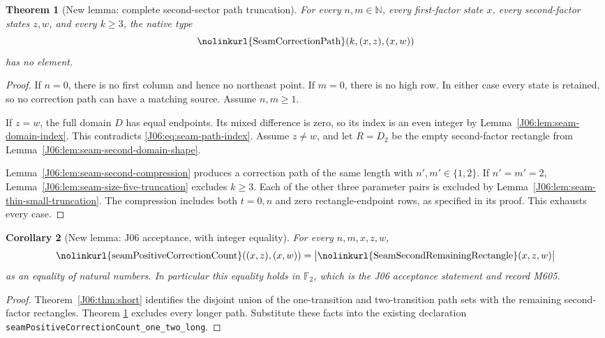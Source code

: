 \documentclass[11pt,oneside]{report}
\newtheorem{theorem}{Theorem}[section]
\newtheorem{corollary}[theorem]{Corollary}
\theoremstyle{definition}
\numberwithin{equation}{section}
\newcommand{\decl}[1]{\textnormal{\nolinkurl{#1}}}
\begin{document}
\begin{theorem}[New lemma: complete second-sector path truncation]
\label{J06:thm:seam-second-long-empty}
For every $n,m\in\mathbb N$, every first-factor state $x$, every
second-factor states $z,w$, and every $k\ge3$, the native type
\[
 \decl{SeamCorrectionPath}(k,(x,z),(x,w))
\]
has no element.
\end{theorem}

\begin{proof}
If $n=0$, there is no first column and hence no northeast point.
If $m=0$, there is no high row. In either case every state is retained,
so no correction path can have a matching source. Assume $n,m\ge1$.

If $z=w$, the full domain $D$ has equal endpoints. Its mixed difference
is zero, so its index is an even integer by
Lemma~\ref{J06:lem:seam-domain-index}. This contradicts
\eqref{J06:eq:seam-path-index}. Assume $z\ne w$, and let $R=D_2$ be the
empty second-factor rectangle from
Lemma~\ref{J06:lem:seam-second-domain-shape}.

Lemma~\ref{J06:lem:seam-second-compression} produces a correction path
of the same length with $n',m'\in\{1,2\}$.
If $n'=m'=2$, Lemma~\ref{J06:lem:seam-size-five-truncation} excludes
$k\ge3$. Each of the other three parameter pairs is excluded by
Lemma~\ref{J06:lem:seam-thin-small-truncation}. The compression includes
both $t=0,n$ and zero rectangle-endpoint rows, as specified in its proof.
This exhausts every case.
\end{proof}

\begin{corollary}[New lemma: J06 acceptance, with integer equality]
\label{J06:cor:seam-second-complete}
For every $n,m,x,z,w$,
\[
 \decl{seamPositiveCorrectionCount}((x,z),(x,w))
 =\bigl|\decl{SeamSecondRemainingRectangle}(x,z,w)\bigr|
\]
as an equality of natural numbers. In particular this equality holds
in $\mathbb F_2$, which is the J06 acceptance statement and record M605.
\end{corollary}

\begin{proof}
Theorem~\ref{J06:thm:short} identifies
the disjoint union of the one-transition and two-transition path sets
with the remaining second-factor rectangles. Theorem
\ref{J06:thm:seam-second-long-empty} excludes every longer path.
Substitute these facts into the existing declaration
\decl{seamPositiveCorrectionCount_one_two_long}.
\end{proof}
\end{document}
